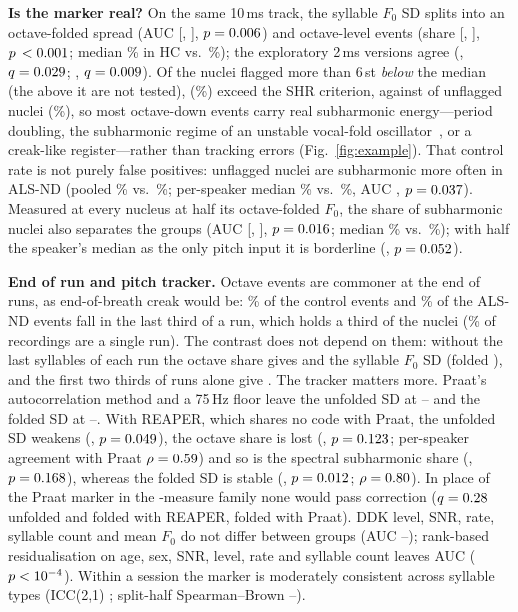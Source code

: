 \documentclass{article}
\begin{document}
\textbf{Is the marker real?} On the same 10\,ms track, the syllable $F_0$ SD splits into an octave-folded spread (AUC \rFoldAUC{} [\rFoldLo, \rFoldHi], $p=0.006$) and octave-level events (share \rOctAUC{} [\rOctLo, \rOctHi], $p\,<0.001$; median \rOctMedHC\% in HC vs.\ \rOctMedND\%); the exploratory 2\,ms versions agree (\eMacroAUC, $q=0.029$; \eOctDAUC, $q=0.009$). Of the \shrDown{} nuclei flagged more than 6\,st \emph{below} the median (the \shrUp{} above it are not tested), \shrDownGenuine{} (\shrDownPct\%) exceed the SHR criterion, against \shrCtrlAbove{} of \shrCtrlN{} unflagged nuclei (\shrCtrlFP\%), so most octave-down events carry real subharmonic energy---period doubling, the subharmonic regime of an unstable vocal-fold oscillator~\cite{herzel1994nonlinear}, or a creak-like register---rather than tracking errors (Fig.~\ref{fig:example}). That control rate is not purely false positives: unflagged nuclei are subharmonic more often in ALS-ND (pooled \rUnflRateND\% vs.\ \rUnflRateHC\%; per-speaker median \rUnflMedND\% vs.\ \rUnflMedHC\%, AUC \rUnflAUC, $p=0.037$). Measured at every nucleus at half its octave-folded $F_0$, the share of subharmonic nuclei also separates the groups (AUC \rSubhAUC{} [\rSubhLo, \rSubhHi], $p=0.016$; median \rSubhMedHC\% vs.\ \rSubhMedND\%); with half the speaker's median as the only pitch input it is borderline (\rSubhMedAUC, $p=0.052$).

\textbf{End of run and pitch tracker.} Octave events are commoner at the end of runs, as end-of-breath creak would be: \rPosHCLast\% of the \rPosHCN{} control events and \rPosNDLast\% of the \rPosNDN{} ALS-ND events fall in the last third of a run, which holds a third of the nuclei (\rSingleRun\% of recordings are a single run). The contrast does not depend on them: without the last \rDropLast{} syllables of each run the octave share gives \rOctTrimAUC{} and the syllable $F_0$ SD \rSdTrimAUC{} (folded \rFoldTrimAUC), and the first two thirds of runs alone give \rOctEarlyAUC. The tracker matters more. Praat's autocorrelation method and a 75\,Hz floor leave the unfolded SD at \trkMin--\trkMax{} and the folded SD at \trkFoldMin--\trkFoldMax. With REAPER, which shares no code with Praat, the unfolded SD weakens (\trkRpr, $p=0.049$), the octave share is lost (\trkOctRpr, $p=0.123$; per-speaker agreement with Praat $\rho=0.59$) and so is the spectral subharmonic share (\rSubhRprAUC, $p=0.168$), whereas the folded SD is stable (\trkFoldRpr, $p=0.012$; $\rho=0.80$). In place of the Praat marker in the \nFeat-measure family none would pass correction ($q=0.28$ unfolded and \trkFoldRprQ{} folded with REAPER, \trkFoldCcQ{} folded with Praat). DDK level, SNR, rate, syllable count and mean $F_0$ do not differ between groups (AUC \covRateAUC--\covLevelAUC); rank-based residualisation on age, sex, SNR, level, rate and syllable count leaves AUC \covAdjAUC{} ($p<10^{-4}$). Within a session the marker is moderately consistent across syllable types (ICC(2,1) \iccAll; split-half Spearman--Brown \sbMin--\sbMax).
\end{document}
